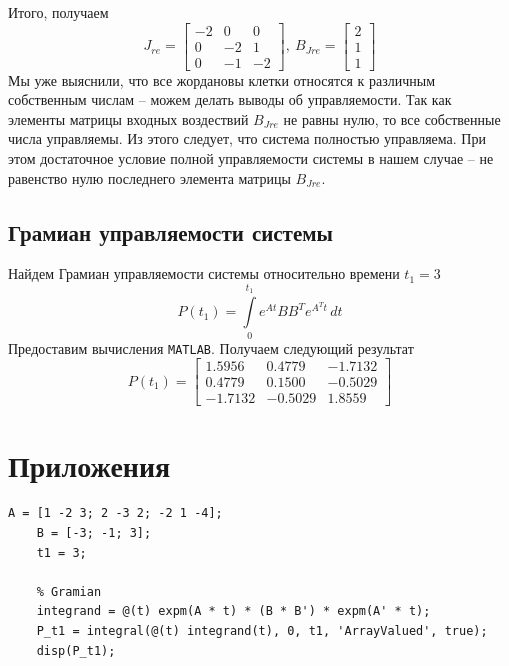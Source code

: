 \documentclass[a4paper, 12pt]{article}
\begin{document}
    Итого, получаем
    $$
    J_{re}=\begin{bmatrix}
        -2 &0 &0\\
        0 &-2 &1\\
        0 &-1 &-2
    \end{bmatrix},\
    B_{Jre}=\begin{bmatrix}
        2\\
        1\\
        1
    \end{bmatrix}
    $$
    Мы уже выяснили, что все жордановы клетки относятся к различным собственным числам -- можем делать выводы об управляемости.
    Так как элементы матрицы входных воздествий $B_{Jre}$ не равны нулю, то все собственные числа управляемы. Из этого следует, что
    система полностью управляема. При этом достаточное условие полной управляемости системы в нашем случае -- не равенство нулю
    последнего элемента матрицы $B_{Jre}$.


    \subsection{Грамиан управляемости системы}
    Найдем Грамиан управляемости системы относительно времени $t_1=3$
    $$P(t_1)=\int\limits_{0}^{t_1}e^{At}BB^Te^{A^Tt}\,dt$$
    Предоставим вычисления \texttt{MATLAB}. Получаем следующий результат
    $$P(t_1)=\begin{bmatrix}
    1.5956    &0.4779   &-1.7132\\
    0.4779    &0.1500   &-0.5029\\
   -1.7132   &-0.5029    &1.8559
    \end{bmatrix}$$


    \section{Приложения}
    \begin{lstlisting}[label=gramian1, caption={Программа для вычисления Грамиана относительно $t_1=3$}]
    A = [1 -2 3; 2 -3 2; -2 1 -4];
    B = [-3; -1; 3];
    t1 = 3;

    % Gramian
    integrand = @(t) expm(A * t) * (B * B') * expm(A' * t);
    P_t1 = integral(@(t) integrand(t), 0, t1, 'ArrayValued', true);
    disp(P_t1);
    \end{lstlisting}
\end{document}
